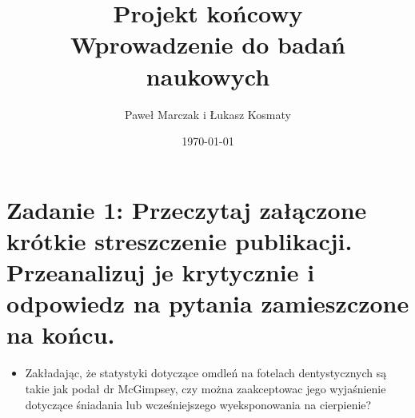 \documentclass[11pt]{article}   %
\begin{document}
	
	\title{%
		Projekt końcowy\\
		\large Wprowadzenie do badań naukowych}
	\author{Paweł Marczak i Łukasz Kosmaty}         %
	\date{\today}    %
	\maketitle
	
	
	\section*{Zadanie 1: \normalsize{Przeczytaj załączone krótkie streszczenie publikacji. Przeanalizuj je krytycznie i odpowiedz na
		pytania zamieszczone na końcu.}}     %
	\begin{itemize}
		\item Zakładając, że statystyki dotyczące omdleń na fotelach dentystycznych są takie jak podał
		dr McGimpsey, czy można zaakceptowac jego wyjaśnienie dotyczące śniadania lub
		wcześniejszego wyeksponowania na cierpienie?
	\end{itemize}
\end{document}
